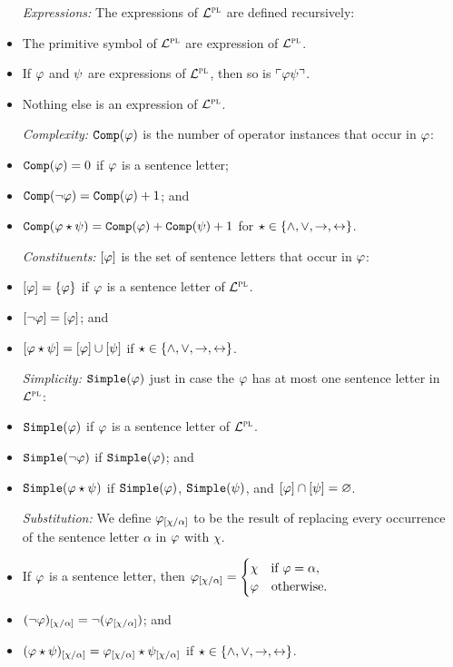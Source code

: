 \documentclass[a4paper, 11pt]{article} %
\begin{document}
\begin{itemize}
  \item[\it Expressions:] The expressions of $\mathcal{L}^{\textsc{pl}}$ are defined recursively: 
    \item The primitive symbol of $\mathcal{L}^{\textsc{pl}}$ are expression of $\mathcal{L}^{\textsc{pl}}$.
    \item If $\varphi$ and $\psi$ are expressions of $\mathcal{L}^{\textsc{pl}}$, then so is $\ulcorner\varphi\psi\urcorner$.
    \item Nothing else is an expression of $\mathcal{L}^{\textsc{pl}}$.
  \item[\it Complexity:] $\texttt{Comp}(\varphi)$ is the number of operator instances that occur in $\varphi$: 
    \item $\texttt{Comp}(\varphi) = 0$ if $\varphi$ is a sentence letter; 
    \item $\texttt{Comp}(\neg\varphi) = \texttt{Comp}(\varphi) + 1$; and 
    \item $\texttt{Comp}(\varphi \star \psi) = \texttt{Comp}(\varphi) + \texttt{Comp}(\psi) + 1$ for $\star \in \lbrace\wedge,\vee,\rightarrow,\leftrightarrow\rbrace$.
  \item[\it Constituents:] $[\varphi]$ is the set of sentence letters that occur in $\varphi$:
      \item $[\varphi]=\lbrace\varphi\rbrace$ if $\varphi$ is a sentence letter of $\mathcal{L}^{\textsc{pl}}$.
      \item $[\neg \varphi]=[\varphi]$; and
      \item $[\varphi \star \psi]=[\varphi] \cup [\psi]$ if $\star \in \lbrace\wedge,\vee,\rightarrow,\leftrightarrow\rbrace$.
  \item[\it Simplicity:] $\texttt{Simple}(\varphi)$ just in case the $\varphi$ has at most one sentence letter in $\mathcal{L}^{\textsc{pl}}$:
      \item $\texttt{Simple}(\varphi)$ if $\varphi$ is a sentence letter of $\mathcal{L}^{\textsc{pl}}$.
      \item $\texttt{Simple}(\neg \varphi)$ if $\texttt{Simple}(\varphi)$; and
      \item $\texttt{Simple}(\varphi \star \psi)$ if $\texttt{Simple}(\varphi)$, $\texttt{Simple}(\psi)$, and $[\varphi]\cap[\psi]=\varnothing$.
  \item[\it Substitution:] We define $\varphi_{[\chi/\alpha]}$ to be the result of replacing every occurrence of the sentence letter $\alpha$ in $\varphi$ with $\chi$.
      \vspace{-.12in}
      \item If $\varphi$ is a sentence letter, then $\varphi_{[\chi/\alpha]}=
        \begin{cases}
          \chi \quad\text{if } \varphi=\alpha,\\
          \varphi \quad\text{otherwise.}
        \end{cases}$
      \vspace{-.12in}
      \item $(\neg\varphi)_{[\chi/\alpha]}=\neg(\varphi_{[\chi/\alpha]})$; and
      \item $(\varphi\star\psi)_{[\chi/\alpha]}=\varphi_{[\chi/\alpha]}\star\psi_{[\chi/\alpha]}$ if $\star \in \lbrace\wedge,\vee,\rightarrow,\leftrightarrow\rbrace$.
\end{itemize}
\end{document}

